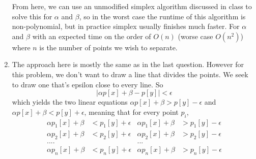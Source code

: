 \documentclass[11pt]{article}
\begin{document}
\begin{enumerate}
		From here, we can use an unmodified simplex algorithm discussed
		in class to solve this for $\alpha$ and $\beta$, so in the worst case the runtime of this
		algorithm is non-polynomial, but in practice simplex usually
		finishes much faster.
		For $\alpha$ and $\beta$ with an expected time on the order of
		$O(n)$ (worse case $O(n^2)$) where $n$ is the number of points we wish to
		separate. 
	\item The approach here is mostly the same as in the last question.
		However for this problem, we don't want to draw a line
		that divides the points. We seek to draw one that's epsilon close
		to every line. So
		$$ |\alpha p[x] + \beta - p[y] | < \epsilon $$
		which yields the two linear equations
		$ \alpha p[x] + \beta > p[y] - \epsilon $ and 
		$ \alpha p[x] + \beta < p[y] + \epsilon $,
		meaning that for every point $p_i$,
		\begin{align*}
			\alpha p_1[x] + \beta & < p_1[y] + \epsilon &
			\alpha p_1[x] + \beta & > p_1[y] - \epsilon \\
			\alpha p_2[x] + \beta & < p_2[y] + \epsilon &
			\alpha p_2[x] + \beta & > p_2[y] - \epsilon \\
			.... & & ...\\
			\alpha p_n[x] + \beta & < p_n[y] + \epsilon &
			\alpha p_n[x] + \beta & > p_n[y] - \epsilon \\
		\end{align*}
		
\end{enumerate}
\end{document}
